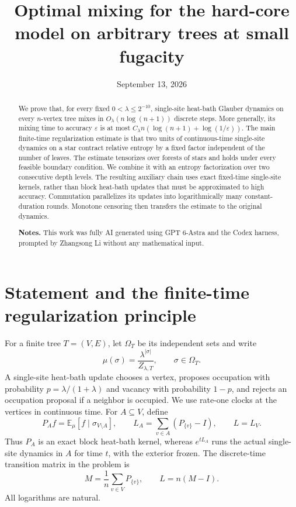 \documentclass[11pt,reqno]{amsart}
\title{Optimal mixing for the hard-core model on arbitrary trees at small fugacity}
\author{}
\date{September 13, 2026}
\theoremstyle{remark}
\newcommand{\E}{\mathbb E}
\numberwithin{equation}{section}
\begin{document}
\begin{abstract}
We prove that, for every fixed $0<\lambda\le 2^{-10}$, single-site heat-bath Glauber dynamics on every $n$-vertex tree mixes in $O_\lambda(n\log(n+1))$ discrete steps. More generally, its mixing time to accuracy $\varepsilon$ is at most $C_\lambda n(\log(n+1)+\log(1/\varepsilon))$.
The main finite-time regularization estimate is that two units of continuous-time single-site dynamics on a star contract relative entropy by a fixed factor independent of the number of leaves. The estimate tensorizes over forests of stars and holds under every feasible boundary condition. We combine it with an entropy factorization over two consecutive depth levels. The resulting auxiliary chain uses exact fixed-time single-site kernels, rather than block heat-bath updates that must be approximated to high accuracy. Commutation parallelizes its updates into logarithmically many constant-duration rounds. Monotone censoring then transfers the estimate to the original dynamics.

{\bf Notes.} This work was fully AI generated using GPT 6-Astra and the Codex harness, prompted by Zhangsong Li without any mathematical input.
\end{abstract}
\maketitle

\section{Statement and the finite-time regularization principle}

For a finite tree $T=(V,E)$, let $\Omega_T$ be its independent sets and write
\[
 \mu(\sigma)=\frac{\lambda^{|\sigma|}}{Z_{\lambda,T}},
 \qquad \sigma\in\Omega_T.
\]
A single-site heat-bath update chooses a vertex, proposes occupation with probability $p=\lambda/(1+\lambda)$ and vacancy with probability $1-p$, and rejects an occupation proposal if a neighbor is occupied. We use rate-one clocks at the vertices in continuous time. For $A\subseteq V$, define
\[
 P_Af=\E_\mu[f\mid \sigma_{V\setminus A}],\qquad
 L_A=\sum_{v\in A}(P_{\{v\}}-I),\qquad L=L_V.
\]
Thus $P_A$ is an exact block heat-bath kernel, whereas $e^{tL_A}$ runs the actual single-site dynamics in $A$ for time $t$, with the exterior frozen. The discrete-time transition matrix in the problem is
\[
 M=\frac1n\sum_{v\in V}P_{\{v\}},\qquad L=n(M-I).
\]
All logarithms are natural.
\end{document}
